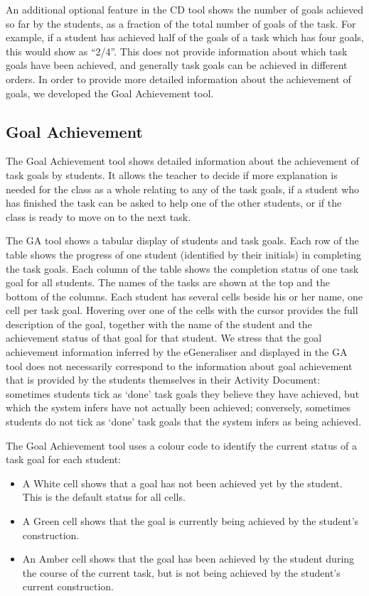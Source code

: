 An additional optional feature in the CD tool shows the number of
goals achieved so far by the students, as a fraction of the total
number of goals of the task. For example, if a student has achieved
half of the goals of a task which has four goals, this would show as
“2/4”. This does not provide information about which task goals have
been achieved, and generally task goals can be achieved in different
orders. In order to provide more detailed information about the
achievement of goals, we developed the Goal Achievement tool.


\subsection{Goal Achievement}
\label{sec:goal-achievement}

The Goal Achievement tool shows detailed information about the
achievement of task goals by students. It allows the teacher to decide
if more explanation is needed for the class as a whole relating to any
of the task goals, if a student who has finished the task can be asked
to help one of the other students, or if the class is ready to move on
to the next task. 

The GA tool shows a tabular display of students and task goals. Each
row of the table shows the progress of one student (identified by
their initials) in completing the task goals. Each column of the table
shows the completion status of one task goal for all students. The
names of the tasks are shown at the top and the bottom of the
columns. Each student has several cells beside his or her name, one
cell per task goal. Hovering over one of the cells with the cursor
provides the full description of the goal, together with the name of
the student and the achievement status of that goal for that
student. We stress that the goal achievement information inferred by
the eGeneraliser and displayed in the GA tool does not necessarily
correspond to the information about goal achievement that is provided
by the students themselves in their Activity Document: sometimes
students tick as `done’ task goals they believe they have achieved,
but which the system infers have not actually been achieved;
conversely, sometimes students do not tick as `done’ task goals that
the system infers as being achieved.
 
The Goal Achievement tool uses a colour code to identify the current
status of a task goal for each student:

\begin{itemize}
\item A White cell shows that a goal has not been achieved yet by the
student. This is the default status for all cells.
\item A Green cell
shows that the goal is currently being achieved by the student’s
construction.
\item An Amber cell shows that the goal has been achieved
by the student during the course of the current task, but is not being
achieved by the student’s current construction.
\end{itemize}



